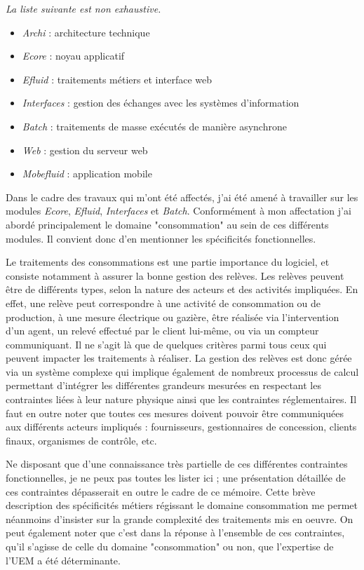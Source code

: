 \documentclass[a4paper, 12pt]{report}
\begin{document}
\textit{La liste suivante est non exhaustive.}

\begin{itemize}
  \item \textit{Archi} : architecture technique
  \item \textit{Ecore} : noyau applicatif
  \item \textit{Efluid} : traitements métiers et interface web
  \item \textit{Interfaces} : gestion des échanges avec les systèmes d'information
  \item \textit{Batch} : traitements de masse exécutés de manière asynchrone
  \item \textit{Web} : gestion du serveur web
  \item \textit{Mobefluid} : application mobile
\end{itemize}
\vspace{0.5cm}

Dans le cadre des travaux qui m'ont été affectés, j'ai été amené à travailler sur les modules \textit{Ecore}, \textit{Efluid}, \textit{Interfaces} et \textit{Batch}. Conformément à mon affectation j'ai abordé principalement le domaine "consommation" au sein de ces différents modules. Il convient donc d'en mentionner les spécificités fonctionnelles.

Le traitements des consommations est une partie importance du logiciel, et consiste notamment à assurer la bonne gestion des relèves. Les relèves peuvent être de différents types, selon la nature des acteurs et des activités impliquées. En effet, une relève peut correspondre à une activité de consommation ou de production, à une mesure électrique ou gazière, être réalisée via l'intervention d'un agent, un relevé effectué par le client lui-même, ou via un compteur communiquant. Il ne s'agit là que de quelques critères parmi tous ceux qui peuvent impacter les traitements à réaliser. La gestion des relèves est donc gérée via un système complexe qui implique également de nombreux processus de calcul permettant d'intégrer les différentes grandeurs mesurées en respectant les contraintes liées à leur nature physique ainsi que les contraintes réglementaires. Il faut en outre noter que toutes ces mesures doivent pouvoir être communiquées aux différents acteurs impliqués : fournisseurs, gestionnaires de concession, clients finaux, organismes de contrôle, etc.

Ne disposant que d'une connaissance très partielle de ces différentes contraintes fonctionnelles, je ne peux pas toutes les lister ici ; une présentation détaillée de ces contraintes dépasserait en outre le cadre de ce mémoire. Cette brève description des spécificités métiers régissant le domaine consommation me permet néanmoins d'insister sur la grande complexité des traitements mis en oeuvre. On peut également noter que c'est dans la réponse à l'ensemble de ces contraintes, qu'il s'agisse de celle du domaine "consommation" ou non, que l'expertise de l'UEM a été déterminante.
\end{document}
